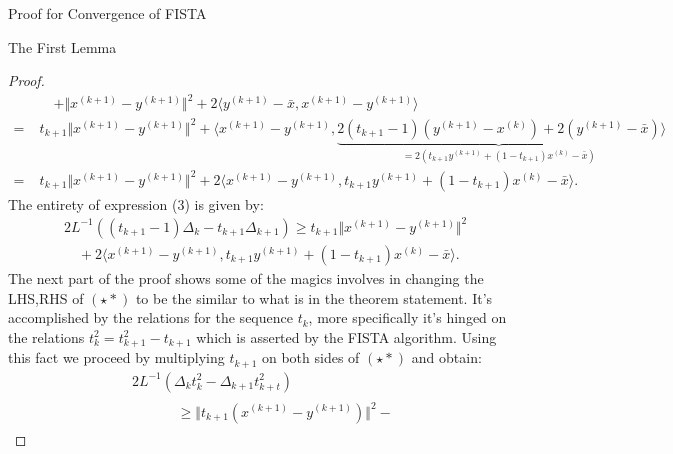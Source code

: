 \documentclass[]{article}
\theoremstyle{definition}
\begin{document}
\begin{section}{Proof for Convergence of FISTA}
\begin{subsection}{The First Lemma}
\begin{proof}
\begin{align*}
                & \quad 
                + \Vert x^{(k + 1)} - y^{(k + 1)}\Vert^2
                + 
                2\langle y^{(k + 1)} - \bar x, x^{(k + 1)} - y^{(k + 1)}\rangle
                \\
                = \; &
                t_{k + 1}\Vert x^{(k + 1)} - y^{(k + 1)}\Vert^2
                + 
                \langle 
                    x^{(k + 1)} - y^{(k + 1)}, 
                    \underbrace{2(t_{k + 1} - 1)(y^{(k + 1)} - x^{(k)}) + 2(y^{(k + 1)} - \bar x) }_
                    {
                        = 2(t_{k + 1}y^{(k + 1)} + (1 - t_{k + 1})x^{(k)} - \bar x)
                    }
                \rangle
                \\
                = \; & 
                t_{k + 1}\Vert x^{(k + 1)} - y^{(k + 1)}\Vert^2
                + 
                2\langle 
                    x^{(k + 1)} - y^{(k + 1)}, 
                    t_{k + 1}y^{(k + 1)} + (1 - t_{k + 1})x^{(k)} - \bar x
                \rangle. 
                \tag{$\star *$RHS}
            \end{align*}
            The entirety of expression (3) is given by: 
            \begin{align*}
                & 2L^{-1}((t_{k + 1} - 1)\Delta_k - t_{k + 1}\Delta_{k + 1})
                \ge 
                t_{k + 1}\Vert x^{(k + 1)} - y^{(k + 1)}\Vert^2
                \\
                & \quad 
                + 
                2\langle 
                    x^{(k + 1)} - y^{(k + 1)}, 
                    t_{k + 1}y^{(k + 1)} + (1 - t_{k + 1})x^{(k)} - \bar x
                \rangle. 
                \tag{$\star *$}
            \end{align*}
            The next part of the proof shows some of the magics involves in changing the LHS,RHS of $(\star *)$ to be the similar to what is in the theorem statement. It's accomplished by the relations for the sequence $t_k$, more specifically it's hinged on the relations $t_k^2 = t^2_{k + 1} - t_{k + 1}$ which is asserted by the FISTA algorithm. Using this fact we proceed by multiplying $t_{k + 1}$ on both sides of $(\star *)$ and obtain: 
            \begin{align*}
                & 2L^{-1}(\Delta_k t_k^2 - \Delta_{k + 1}t_{k + t}^2)
                \\
                & \hspace{2em}\begin{aligned}
                    & \ge 
                    \Vert t_{k + 1}(x^{(k + 1)} - y^{(k + 1)})\Vert^2 - 

\end{aligned}
\end{align*}
\end{proof}
\end{subsection}
\end{section}
\end{document}
